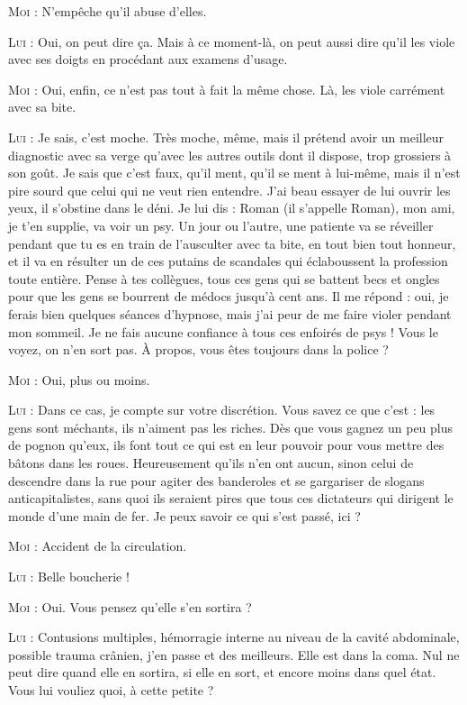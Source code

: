 \begin{dialogue}
\textsc{Moi} : N’empêche qu’il abuse d’elles.

\textsc{Lui} : Oui, on peut dire ça. Mais à ce moment-là, on peut aussi dire qu’il les viole avec ses doigts en procédant aux examens d’usage.

\textsc{Moi} : Oui, enfin, ce n’est pas tout à fait la même chose. Là, les viole carrément avec sa bite.

\textsc{Lui} : Je sais, c’est moche. Très moche, même, mais il prétend avoir un meilleur diagnostic avec sa verge qu’avec les autres outils dont il dispose, trop grossiers à son goût. Je sais que c’est faux, qu’il ment, qu’il se ment à lui-même, mais il n’est pire sourd que celui qui ne veut rien entendre. J’ai beau essayer de lui ouvrir les yeux, il s’obstine dans le déni. Je lui dis : Roman (il s’appelle Roman), mon ami, je t’en supplie, va voir un psy. Un jour ou l’autre, une patiente va se réveiller pendant que tu es en train de l’ausculter avec ta bite, en tout bien tout honneur, et il va en résulter un de ces putains de scandales qui éclaboussent la profession toute entière. Pense à tes collègues, tous ces gens qui se battent becs et ongles pour que les gens se bourrent de médocs jusqu’à cent ans. Il me répond : oui, je ferais bien quelques séances d’hypnose, mais j’ai peur de me faire violer pendant mon sommeil. Je ne fais aucune confiance à tous ces enfoirés de psys ! Vous le voyez, on n’en sort pas. À propos, vous êtes toujours dans la police ?

\textsc{Moi} : Oui, plus ou moins.

\textsc{Lui} : Dans ce cas, je compte sur votre discrétion. Vous savez ce que c’est : les gens sont méchants, ils n’aiment pas les riches. Dès que vous gagnez un peu plus de pognon qu’eux, ils font tout ce qui est en leur pouvoir pour vous mettre des bâtons dans les roues. Heureusement qu’ils n’en ont aucun, sinon celui de descendre dans la rue pour agiter des banderoles et se gargariser de slogans anticapitalistes, sans quoi ils seraient pires que tous ces dictateurs qui dirigent le monde d’une main de fer. Je peux savoir ce qui s’est passé, ici ?

\textsc{Moi} : Accident de la circulation.

\textsc{Lui} : Belle boucherie !

\textsc{Moi} : Oui. Vous pensez qu’elle s’en sortira ?

\textsc{Lui} : Contusions multiples, hémorragie interne au niveau de la cavité abdominale, possible trauma crânien, j’en passe et des meilleurs. Elle est dans la coma. Nul ne peut dire quand elle en sortira, si elle en sort, et encore moins dans quel état. Vous lui vouliez quoi, à cette petite ?


\end{dialogue}
